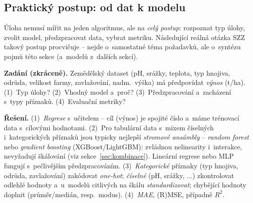 \subsection{Praktický postup: od dat k modelu}

Úloha nemusí mířit na jeden algoritmus, ale na \emph{celý postup}: rozpoznat typ úlohy, zvolit model, předzpracovat data, vybrat metriku. Následující reálná otázka SZZ takový postup procvičuje -- nejde o~samostatné téma požadavků, ale o~syntézu pojmů této sekce (a~modelů z~dalších sekcí).

\begin{priklad}
\par
\textbf{Zadání (zkráceně).} Zemědělský dataset (pH, srážky, teplota, typ hnojiva, odrůda, velikost farmy, zavlažování, nadm.\ výška) má předpovídat \emph{výnos} (t/ha). (1)~Typ úlohy? (2)~Vhodný model a~proč? (3)~Předzpracování a~zacházení s~typy příznaků. (4)~Evaluační metriky?

\smallskip
\textbf{Řešení.} (1)~\emph{Regrese} s~učitelem -- cíl (výnos) je spojité číslo a~máme trénovací data s~cílovými hodnotami. (2)~Pro tabulární data s~mixem číselných i~kategorických příznaků jsou typicky nejlepší \emph{stromové ansámbly} -- \emph{random forest} nebo \emph{gradient boosting} (XGBoost/LightGBM): zvládnou nelinearity i~interakce, nevyžadují škálování (viz sekce~\ref{sec:kombinace}). Lineární regrese nebo MLP fungují s~pečlivějším předzpracováním. (3)~\emph{Kategorické} příznaky (typ hnojiva, odrůda, zavlažování) zakódovat \emph{one-hot}; \emph{číselné} (pH, srážky, $\dots$) zkontrolovat odlehlé hodnoty a~u~modelů citlivých na škálu \emph{standardizovat}; chybějící hodnoty doplnit (průměr/medián, resp.\ modus). (4)~\emph{MAE}, (R)MSE, případně $R^2$.
\end{priklad}
